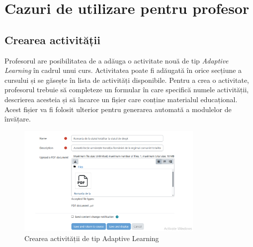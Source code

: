 \section{Cazuri de utilizare pentru profesor}

\subsection{Crearea activității}
Profesorul are posibilitatea de a adăuga o activitate nouă de tip \textit{Adaptive Learning} în cadrul unui curs. Activitatea poate fi adăugată în orice secțiune a cursului și se găsește
în lista de activități disponibile. Pentru a crea o activitate, profesorul trebuie să completeze un formular în care specifică numele activității, descrierea acesteia și să încarce un fișier
care conține materialul educațional. Acest fișier va fi folosit ulterior pentru generarea automată a modulelor de învățare. 
\begin{figure}[H]
    \centering
    \includegraphics[width=0.8\textwidth]{images/formPage.png}
    \caption{Crearea activității de tip Adaptive Learning}
    \label{fig:creare_activitate}
\end{figure}

